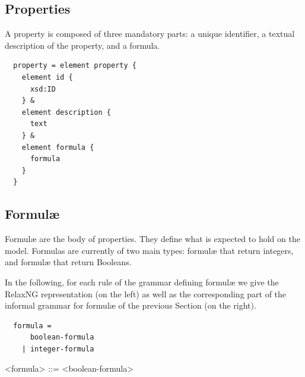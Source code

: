 \documentclass[10pt,english,a4paper]{article}
\begin{document}
\subsection{Properties}
A property is composed of three mandatory parts: a unique identifier, a textual description
of the property, and a formula.


\begin{lstlisting}
  property = element property {
    element id {
      xsd:ID
    } &
    element description {
      text
    } &
    element formula {
      formula
    }
  }
\end{lstlisting}


\subsection{Formul{\ae}}
Formul{\ae} are the body of properties.
They define what is expected to hold on the model.
Formulas are currently of two main types: formul{\ae} that return integers, and formul{\ae}
that return Booleans.

In the following, for each rule of the grammar defining formulæ we give the RelaxNG representation (on the left) as well as the corresponding part of the informal grammar for formulæ of the previous Section (on the right).


\begin{multicols}{2}
\begin{lstlisting}
  formula =
      boolean-formula
    | integer-formula
\end{lstlisting}
\columnbreak
\scriptsize
\scriptsize\begin{grammar}
<formula> ::= <boolean-formula>
\end{grammar}
\end{multicols}
\end{document}
